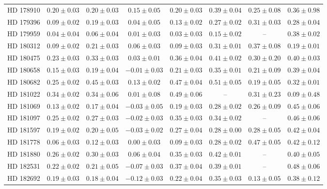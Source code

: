 \begin{table*}
\begin{tabular}{cccccccc}
HD 178910 & $0.20 \pm 0.03$ & $0.20 \pm 0.03$ & $0.15 \pm 0.05$ & $0.20 \pm 0.03$ & $0.39 \pm 0.04$ & $0.25 \pm 0.08$ & $0.36 \pm 0.98$ \\
HD 179396 & $0.09 \pm 0.02$ & $0.19 \pm 0.03$ & $0.04 \pm 0.05$ & $0.13 \pm 0.02$ & $0.27 \pm 0.02$ & $0.31 \pm 0.03$ & $0.28 \pm 0.04$ \\
HD 179959 & $0.04 \pm 0.04$ & $0.06 \pm 0.04$ & $0.01 \pm 0.03$ & $0.03 \pm 0.03$ & $0.15 \pm 0.02$ & -- & $0.38 \pm 0.02$ \\
HD 180312 & $0.09 \pm 0.02$ & $0.21 \pm 0.03$ & $0.06 \pm 0.03$ & $0.09 \pm 0.03$ & $0.31 \pm 0.01$ & $0.37 \pm 0.08$ & $0.19 \pm 0.01$ \\
HD 180475 & $0.23 \pm 0.03$ & $0.33 \pm 0.03$ & $0.03 \pm 0.01$ & $0.36 \pm 0.04$ & $0.41 \pm 0.02$ & $0.30 \pm 0.20$ & $0.40 \pm 0.03$ \\
HD 180658 & $0.15 \pm 0.03$ & $0.19 \pm 0.04$ & $-0.01 \pm 0.03$ & $0.21 \pm 0.03$ & $0.35 \pm 0.01$ & $0.21 \pm 0.09$ & $0.39 \pm 0.04$ \\
HD 180682 & $0.25 \pm 0.02$ & $0.45 \pm 0.03$ & $0.13 \pm 0.02$ & $0.47 \pm 0.04$ & $0.51 \pm 0.05$ & $0.19 \pm 0.05$ & $0.32 \pm 0.01$ \\
HD 181022 & $0.34 \pm 0.02$ & $0.34 \pm 0.06$ & $0.01 \pm 0.08$ & $0.49 \pm 0.06$ & -- & $0.31 \pm 0.23$ & $0.09 \pm 0.48$ \\
HD 181069 & $0.13 \pm 0.02$ & $0.17 \pm 0.04$ & $-0.03 \pm 0.05$ & $0.19 \pm 0.03$ & $0.28 \pm 0.02$ & $0.26 \pm 0.09$ & $0.45 \pm 0.06$ \\
HD 181097 & $0.25 \pm 0.02$ & $0.27 \pm 0.03$ & $-0.02 \pm 0.03$ & $0.35 \pm 0.03$ & $0.34 \pm 0.02$ & -- & $0.46 \pm 0.06$ \\
HD 181597 & $0.19 \pm 0.02$ & $0.20 \pm 0.05$ & $-0.03 \pm 0.02$ & $0.27 \pm 0.04$ & $0.28 \pm 0.00$ & $0.28 \pm 0.05$ & $0.42 \pm 0.04$ \\
HD 181778 & $0.06 \pm 0.03$ & $0.12 \pm 0.03$ & $0.00 \pm 0.03$ & $0.09 \pm 0.03$ & $0.28 \pm 0.02$ & $0.47 \pm 0.05$ & $0.42 \pm 0.12$ \\
HD 181880 & $0.26 \pm 0.02$ & $0.30 \pm 0.03$ & $0.06 \pm 0.04$ & $0.35 \pm 0.03$ & $0.42 \pm 0.01$ & -- & $0.40 \pm 0.05$ \\
HD 182531 & $0.22 \pm 0.02$ & $0.21 \pm 0.05$ & $-0.07 \pm 0.03$ & $0.37 \pm 0.04$ & $0.39 \pm 0.01$ & -- & $0.48 \pm 0.06$ \\
HD 182692 & $0.19 \pm 0.03$ & $0.18 \pm 0.04$ & $-0.12 \pm 0.03$ & $0.22 \pm 0.04$ & $0.35 \pm 0.03$ & $0.13 \pm 0.05$ & $0.38 \pm 0.12$ \\

\end{tabular}
\end{table*}
